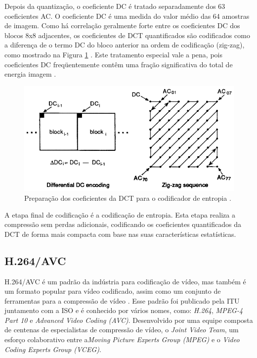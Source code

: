 Depois da quantização, o coeficiente DC é tratado separadamente dos 63 coeficientes AC. O coeficiente DC é uma medida do valor médio das 64 amostras de imagem. Como há correlação geralmente forte entre os coeficientes DC dos blocos 8x8 adjacentes, os coeficientes de DCT quantificados são codificados como a diferença de o termo DC do bloco anterior na ordem de codificação (zig-zag), como mostrado na Figura \ref{ZIG_ZAG} . Este tratamento especial vale a pena, pois coeficientes DC freqüentemente contêm uma fração significativa do total de energia imagem \cite{wallace1991jpeg}.

\begin{figure}[h]
	\centering
	\includegraphics[scale=0.55]{figuras/ZIG-ZAG.png}
	\caption{Preparação dos coeficientes da DCT para o codificador de entropia \cite{wallace1991jpeg}.}
	\label{ZIG_ZAG}
\end{figure}

A etapa final de codificação é a codificação de entropia.  Esta etapa realiza a compressão sem perdas adicionais, codificando os coeficientes quantificados da DCT de forma mais compacta com base nas suas características estatísticas.

\subsection{H.264/AVC}

H.264/AVC é um padrão da indústria para codificação de vídeo, mas também é um formato popular para vídeo codificado, assim como um conjunto de ferramentas para a compressão de vídeo \cite{richardson2011h}. Esse padrão foi publicado pela ITU juntamento com a ISO e é conhecido por vários nomes, como: \textit{H.264}, \textit{MPEG-4 Part 10} e \textit{Advanced Video Coding (AVC)}. Desenvolvido por uma equipe composta de centenas de especialistas de compressão de vídeo, o \textit{Joint Video Team}, um esforço colaborativo entre a\textit{Moving Picture Experts Group (MPEG)} e o \textit{Video Coding Experts Group (VCEG)}.

